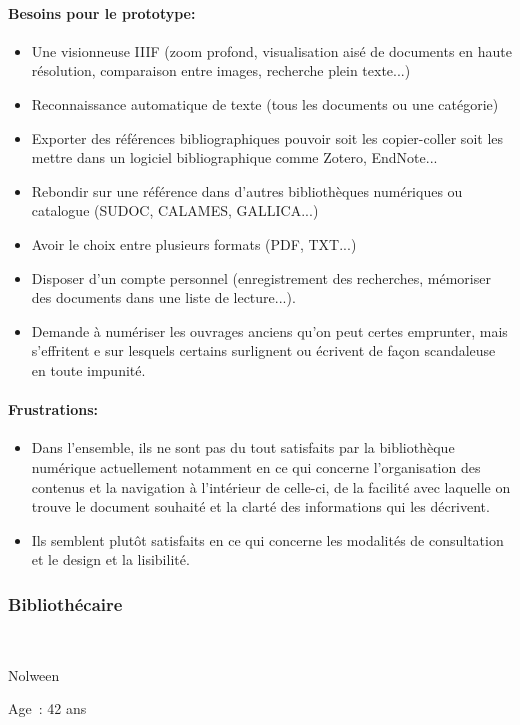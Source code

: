 \paragraph*{Besoins pour le prototype:}
\begin{itemize}
	\item Une visionneuse IIIF (zoom profond, visualisation aisé de documents en haute résolution, comparaison entre images, recherche plein texte...)
\item Reconnaissance automatique de texte (tous les documents ou une catégorie)
\item Exporter des références bibliographiques pouvoir soit les copier-coller soit les mettre dans un logiciel bibliographique comme Zotero, EndNote...
\item Rebondir sur une référence dans d'autres bibliothèques numériques ou catalogue (SUDOC, CALAMES, GALLICA...)
\item Avoir le choix entre plusieurs formats (PDF, TXT...)
\item Disposer d'un compte personnel (enregistrement des recherches, mémoriser des documents dans une liste de lecture...).
\item Demande à numériser les ouvrages anciens qu’on peut certes emprunter, mais s’effritent e sur lesquels certains surlignent ou écrivent de façon scandaleuse en toute impunité.
\end{itemize}
\paragraph*{Frustrations:}
\begin{itemize}
	\item Dans l’ensemble, ils ne sont pas du tout satisfaits par la bibliothèque numérique actuellement notamment en ce qui concerne l’organisation des contenus et la navigation à l’intérieur de celle-ci, de la facilité avec laquelle on trouve le document souhaité et la clarté des informations qui les décrivent.
\item Ils semblent plutôt satisfaits en ce qui concerne les modalités de consultation et le design et la lisibilité.
\end{itemize}


\subsubsection*{Bibliothécaire} 
Nolween
 
Age : 42 ans

